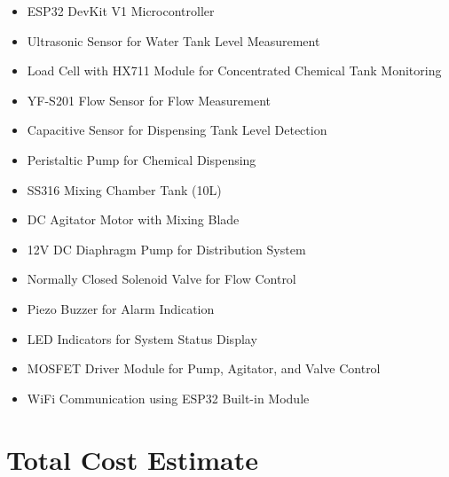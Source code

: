 \documentclass[12pt,a4paper]{report}
\begin{document}
\begin{itemize}

    \item ESP32 DevKit V1 Microcontroller
    \item Ultrasonic Sensor for Water Tank Level Measurement
    \item Load Cell with HX711 Module for Concentrated Chemical Tank Monitoring
    \item YF-S201 Flow Sensor for Flow Measurement
    \item Capacitive Sensor for Dispensing Tank Level Detection
    \item Peristaltic Pump for Chemical Dispensing
    \item SS316 Mixing Chamber Tank (10L)
    \item DC Agitator Motor with Mixing Blade
    \item 12V DC Diaphragm Pump for Distribution System
    \item Normally Closed Solenoid Valve for Flow Control
    \item Piezo Buzzer for Alarm Indication
    \item LED Indicators for System Status Display
    \item MOSFET Driver Module for Pump, Agitator, and Valve Control
    \item WiFi Communication using ESP32 Built-in Module

\end{itemize}

\section{Total Cost Estimate}
\end{document}
